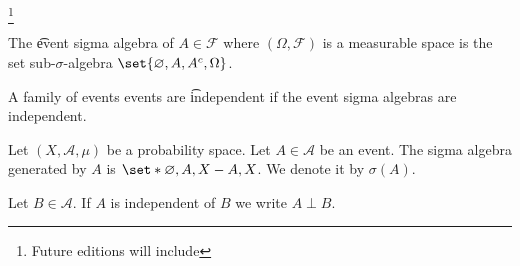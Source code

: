 
  \ifhmode\unskip\fi\footnote{
Future editions will include
  }


The \t{event sigma algebra} of $A \in \mathcal{F} $ where $(\Omega , \mathcal{F} )$ is a measurable space is the set sub-$\sigma $-algebra $\set{\varnothing, A, A^c, \Omega }$.

A family of events events are \t{independent} if the event sigma algebras are independent.


Let $(X, \mathcal{A} , \mu )$ be a probability space.
Let $A \in \mathcal{A} $ be an event.
The sigma algebra generated by $A$ is $\set*{\varnothing, A, X - A, X}$.
We denote it by $\sigma (A)$.

Let $B \in \mathcal{A} $.
If $A$ is independent of $B$ we write $A \perp  B$.


